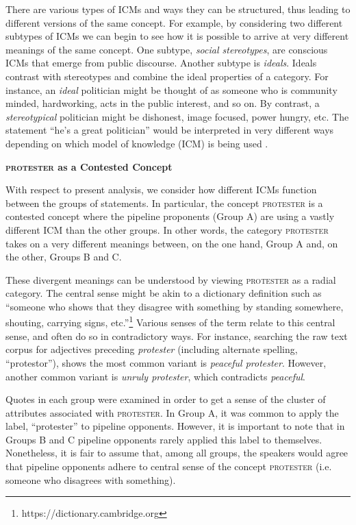 There are various types of ICMs and ways they can be structured, thus leading to different versions of the same concept. For example, by considering two different subtypes of ICMs we can begin to see how it is possible to arrive at very different meanings of the same concept. One subtype, \textit{social stereotypes}, are conscious ICMs that emerge from public discourse. Another subtype is \textit{ideals}. Ideals contrast with stereotypes and combine the ideal properties of a category. For instance, an \textit{ideal} politician might be thought of as someone who is community minded, hardworking, acts in the public interest, and so on. By contrast, a \textit{stereotypical} politician might be dishonest, image focused, power hungry, etc. The statement ``he's a great politician'' would be interpreted in very different ways depending on which model of knowledge (ICM) is being used \citep[274]{Evans2006a}. 

\textbf{\textsc{protester} as a Contested Concept}

With respect to present analysis, we consider how different ICMs function between the groups of statements. In particular, the concept \textsc{protester} is a contested concept where the pipeline proponents (Group A) are using a vastly different ICM than the other groups. In other words, the category \textsc{protester} takes on a very different meanings between, on the one hand, Group A and, on the other, Groups B and C. 

These divergent meanings can be understood by viewing \textsc{protester} as a radial category. The central sense might be akin to a dictionary definition such as ``someone who shows that they disagree with something by standing somewhere, shouting, carrying signs, etc.''\footnote{https://dictionary.cambridge.org} Various senses of the term relate to this central sense, and often do so in contradictory ways. For instance, searching the raw text corpus for adjectives preceding \textit{protester} (including alternate spelling, ``protestor''), shows the most common variant is \textit{peaceful protester}. However, another common variant is \textit{unruly protester}, which contradicts \textit{peaceful}.

Quotes in each group were examined in order to get a sense of the cluster of attributes associated with \textsc{protester}. In Group A, it was common to apply the label, ``protester'' to pipeline opponents. However, it is important to note that in Groups B and C pipeline opponents rarely applied this label to themselves. Nonetheless, it is fair to assume that, among all groups, the speakers would agree that pipeline opponents adhere to central sense of the concept \textsc{protester} (i.e. someone who disagrees with something). 

